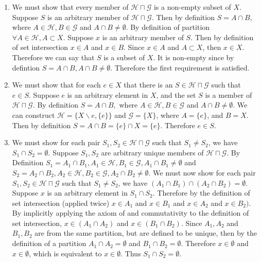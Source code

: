 \documentclass[12pt, letterpaper]{article}
\newcommand{\Hs}{\mathcal{H}}
\newcommand{\G}{\mathcal{G}}
\begin{document}
\begin{enumerate}
	\item We must show that every member of $\Hs \sqcap \G$ is a non-empty subset of $X$.  Suppose $S$ is an arbitrary member of $\Hs \sqcap \G$.  Then by definition $S = A \cap B,$ where $A \in \Hs, B \in \G$ and $A \cap B \neq \emptyset$.   
	 By definition of partition $\forall A \in \Hs, A \subset X$.  Suppose $x$ is an arbitrary member of $S$.  Then by definition of set intersection $x \in A$ and $x \in B$.  
	 Since $x \in A$ and $A \subset X$, then $x \in X.$  Therefore we can say that $S$ is a subset of $X$.  
	 It is non-empty since by defintion $S = A \cap B, A \cap B \neq \emptyset $.  Therefore the first requirement is satisfied.
	 \item We must show that for each $e \in X$ that there is an $S \in \Hs \sqcap \G$ such that $e \in S.$  Suppose $e$ is an arbitrary element in $X$, and the set $S$ is a member of $\Hs \sqcap \G$.  By definition $S = A \cap B,$ where $A \in \Hs, B \in \G$ and $A \cap B \neq \emptyset$.  We can construct $ \Hs = \{ X \backslash e, \{e\}\}$ and $\G  = \{X\}$, where $A = \{e\}$, and $B = X.$  Then by definition $S = A \cap B = \{e\} \cap X = \{e\}.$  Therefore $e \in S.$
	 \item We must show for each pair $S_1, S_2 \in \Hs \sqcap \G$ such that $S_1 \neq S_2$, we have $S_1 \cap S_2 = \emptyset.$  Suppose $S_1,S_2$ are arbitrary unique members of $ \Hs \sqcap \G$.  By Definition $S_1 = A_1 \cap B_1, A_1 \in \Hs, B_1 \in \G, A_1 \cap B_1 \neq \emptyset$ and $S_2 = A_2 \cap B_2, A_2 \in \Hs, B_2 \in \G, A_2 \cap B_2 \neq \emptyset$.  We must now show for each pair $S_1, S_2 \in \Hs \sqcap \G$ such that $S_1 \neq S_2$, we have $(A_1 \cap B_1) \cap (A_2 \cap B_2) = \emptyset.$ Suppose $x$ is an arbitrary element in $S_1 \cap S_2.$ Therefore by the definition of set intersection (applied twice) $x \in A_1$  and $x \in B_1$ and $x \in A_2$ and $x \in B_2)$.  By implicitly applying the axiom of and commutativity to the definition of set intersection, $x \in (A_1 \cap A_2)$ and $x \in (B_1 \cap B_2)$.  Since $A_1, A_2$ and $B_1, B_2$ are from the same partition, but are defined to be unique, then by the definition of a partition $A_1 \cap A_2 = \emptyset$ and $B_1 \cap B_2 = \emptyset$.  Therefore $x \in \emptyset$ and $x \in \emptyset$, which is equivalent to $x \in \emptyset$.  Thus $S_1 \cap S_2 = \emptyset.$  
\end{enumerate}
\end{document}
